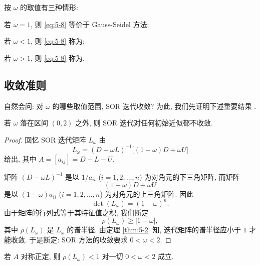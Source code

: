 按 $\omega$ 的取值有三种情形:
\begin{parenlist}
  \item 若 $\omega=1$, 则 \eqref{eq:5-8} 等价于 Gauss-Seidel 方法;
  \item 若 $\omega<1$, 则 \eqref{eq:5-8} 称为;
  \item 若 $\omega>1$, 则 \eqref{eq:5-8} 称为.
\end{parenlist}

\subsection{收敛准则}
\label{subsec:5-4-2}

自然会问: 对 $\omega$ 的哪些取值范围, SOR 迭代收敛? 为此, 我们先证明下述重要结果 \cite{src:30,src:85}.

\begin{theorem}
\label{thm:5-9}
若 $\omega$ 落在区间 $(0,2)$ 之外, 则 SOR 迭代对任何初始近似都不收敛.
\end{theorem}

\begin{proof}
回忆 SOR 迭代矩阵 $L_\omega$ 由
\[
  L_\omega=(D-\omega L)^{-1}\bigl[(1-\omega)D+\omega U\bigr]
\]
给出, 其中 $A=[a_{ij}]=D-L-U$.

矩阵 $(D-\omega L)^{-1}$ 是以 $1/a_{ii}$ ($i=1,2,\ldots,n$) 为对角元的下三角矩阵, 而矩阵
\[
  (1-\omega)D+\omega U
\]
是以 $(1-\omega)a_{ii}$ ($i=1,2,\ldots,n$) 为对角元的上三角矩阵. 因此
\[
  \det(L_\omega)=(1-\omega)^n.
\]
由于矩阵的行列式等于其特征值之积, 我们断定
\[
  \rho(L_\omega)\geqslant|1-\omega|,
\]
其中 $\rho(L_\omega)$ 是 $L_\omega$ 的谱半径. 由定理 \ref{thm:5-2} 知, 迭代矩阵的谱半径应小于 $1$ 才能收敛. 于是断定: SOR 方法的收敛要求 $0<\omega<2$.
\end{proof}

\begin{theorem}
\label{thm:5-10}
若 $A$ 对称正定, 则 $\rho(L_\omega)<1$ 对一切 $0<\omega<2$ 成立.
\end{theorem}

